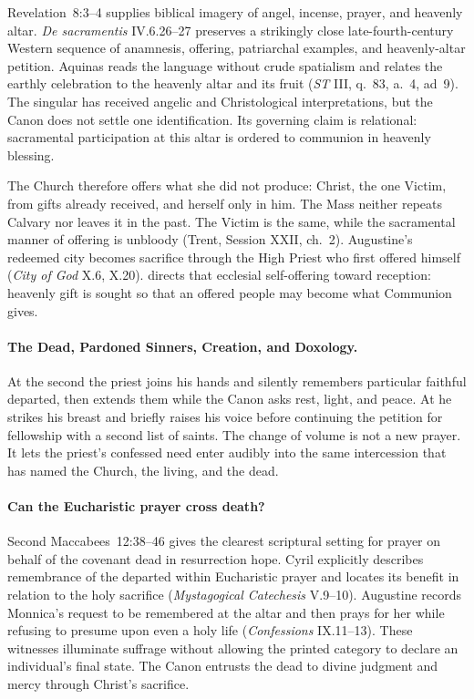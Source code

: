 Revelation~8:3--4 supplies biblical imagery of angel, incense, prayer, and heavenly altar. \emph{De sacramentis} IV.6.26--27 preserves a strikingly close late-fourth-century Western sequence of anamnesis, offering, patriarchal examples, and heavenly-altar petition. Aquinas reads the language without crude spatialism and relates the earthly celebration to the heavenly altar and its fruit (\emph{ST} III, q.~83, a.~4, ad~9). The singular  has received angelic and Christological interpretations, but the Canon does not settle one identification. Its governing claim is relational: sacramental participation at this altar is ordered to communion in heavenly blessing.

The Church therefore offers what she did not produce: Christ, the one Victim, from gifts already received, and herself only in him. The Mass neither repeats Calvary nor leaves it in the past. The Victim is the same, while the sacramental manner of offering is unbloody (Trent, Session XXII, ch.~2). Augustine's redeemed city becomes sacrifice through the High Priest who first offered himself (\emph{City of God} X.6, X.20).  directs that ecclesial self-offering toward reception: heavenly gift is sought so that an offered people may become what Communion gives.

\paragraph{The Dead, Pardoned Sinners, Creation, and Doxology.}

At the second  the priest joins his hands and silently remembers particular faithful departed, then extends them while the Canon asks rest, light, and peace. At  he strikes his breast and briefly raises his voice before continuing the petition for fellowship with a second list of saints. The change of volume is not a new prayer. It lets the priest's confessed need enter audibly into the same intercession that has named the Church, the living, and the dead.

\paragraph{Can the Eucharistic prayer cross death?}
Second Maccabees~12:38--46 gives the clearest scriptural setting for prayer on behalf of the covenant dead in resurrection hope. Cyril explicitly describes remembrance of the departed within Eucharistic prayer and locates its benefit in relation to the holy sacrifice (\emph{Mystagogical Catechesis} V.9--10). Augustine records Monnica's request to be remembered at the altar and then prays for her while refusing to presume upon even a holy life (\emph{Confessions} IX.11--13). These witnesses illuminate suffrage without allowing the printed category to declare an individual's final state. The Canon entrusts the dead to divine judgment and mercy through Christ's sacrifice.

